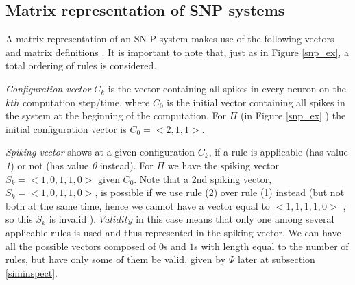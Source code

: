 \documentclass{svmultm}
\newcommand{\sredmark}[2]{\color{red} \sout{#1} #2 \color{black}}
\begin{document}







\subsection{Matrix representation of SNP systems}
A matrix representation of an SN P system makes use of the
following vectors and matrix definitions \cite{snpbrain}\cite{snpmat} . It is important to note that, just as in Figure \ref{snp_ex}, a total ordering of rules is {considered}.

\textit{Configuration vector} $C_k$ is the vector containing all spikes in every neuron on the $kth$ computation step/time, where $C_0$ is the initial vector containing all spikes in the system at the beginning of the computation. For $\Pi$ (in Figure \ref{snp_ex} ) the initial configuration vector is $C_0 = < 2, 1, 1 >$.

\textit{Spiking vector} shows at a given configuration $C_k$, if a
rule is applicable (has value \textit{1}) or not (has value \textit{0} instead). For $\Pi$ we have the
spiking vector $S_k = < 1, 0, 1, 1, 0 >$ given $C_0$.
Note that a 2nd spiking vector, $S_k = < 1, 0, 1, 1, 0 >$, is
possible if we use rule (2) over rule (1) instead (but not both at the same time, hence we cannot have a vector equal to
$< 1, 1, 1, 1, 0>$\sredmark{, so this $S_k$ is invalid }{}). $Validity$ in this case means that only one among several applicable rules is used and thus represented in the spiking vector. We can have all the possible vectors composed of $0$s and $1$s with length equal to the number of rules, but have only some of them be valid, given by $\Psi$ later at subsection \ref{siminspect}.
\end{document}
